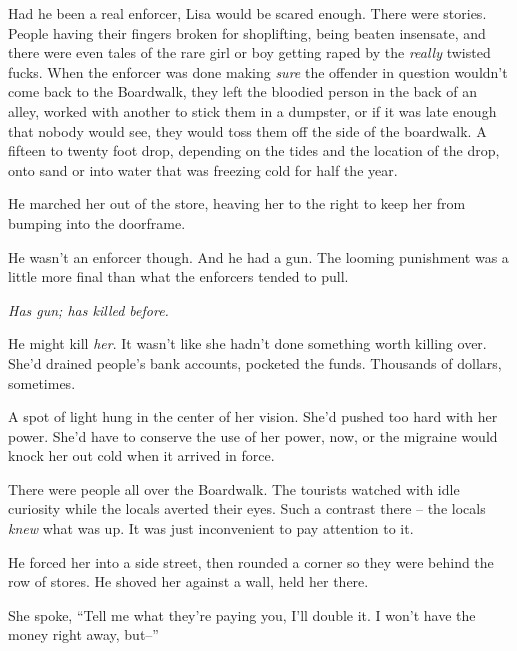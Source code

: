 Had he been a real enforcer, Lisa would be scared enough.  There were stories.  People having their fingers broken for shoplifting, being beaten insensate, and there were even tales of the rare girl or boy getting raped by the \emph{really} twisted fucks.  When the enforcer was done making \emph{sure} the offender in question wouldn't come back to the Boardwalk, they left the bloodied person in the back of an alley, worked with another to stick them in a dumpster, or if it was late enough that nobody would see, they would toss them off the side of the boardwalk.  A fifteen to twenty foot drop, depending on the tides and the location of the drop, onto sand or into water that was freezing cold for half the year.



He marched her out of the store, heaving her to the right to keep her from bumping into the doorframe.



He wasn't an enforcer though.  And he had a gun.  The looming punishment was a little more final than what the enforcers tended to pull.



\emph{Has gun; has killed before.}



He might kill \emph{her}.  It wasn't like she hadn't done something worth killing over.  She'd drained people's bank accounts, pocketed the funds.  Thousands of dollars, sometimes.



A spot of light hung in the center of her vision.  She'd pushed too hard with her power.  She'd have to conserve the use of her power, now, or the migraine would knock her out cold when it arrived in force.



There were people all over the Boardwalk.  The tourists watched with idle curiosity while the locals averted their eyes.  Such a contrast there – the locals \emph{knew} what was up.  It was just inconvenient to pay attention to it.



He forced her into a side street, then rounded a corner so they were behind the row of stores.  He shoved her against a wall, held her there.



She spoke, ``Tell me what they're paying you, I'll double it.  I won't have the money right away, but--''



